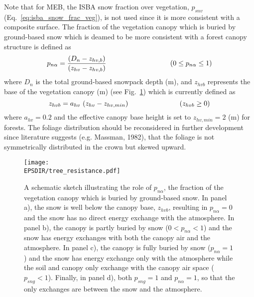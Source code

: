 Note that for MEB, the ISBA snow fraction over vegetation, 
$p_{snv}$ (Eq.~\ref{eq:isba_snow_frac_veg}), 
is not used since it is
more consistent with a composite surface.
The fraction of the vegetation canopy which is buried by ground-based snow
which is deamed to be more consistent with a forest canopy structure
is defined as 
%
\begin{equation}
\label{eq:meb_LAIcansnow}
p_{n\alpha} = 
\frac
{\left(D_n - z_{hv,b}\right)}
{\left(z_{hv} - z_{hv,b}\right)}
\hskip1.25in
\left( 0 \leq  p_{n\alpha} \leq 1\right)
\end{equation}
%
where $D_n$ is the total ground-based snowpack depth (m), 
and $z_{hvb}$
represents the base of the vegetation canopy (m) 
(see Fig.~\ref{fig:forest_snow_MEB}) which is currently defined as
%
\begin{equation}
\label{eq:meb_pn_alphan}
z_{hvb} = a_{hv}\,\left(z_{hv} - z_{hv,min}\right)
\hskip1.in
\left(z_{hvb} \geq 0\right)
%
\end{equation}
%
where $a_{hv}=0.2$ and the effective canopy base height is
set to $z_{hv,min}=2$ (m) for forests. The foliage distribution
should be reconsidered in further development since literature
suggests
(e.g. Massman, 1982)\nocite{Massman1982}, 
that the foliage is not
symmetrically distributed in the crown but skewed upward.



\begin{figure}[!b]
\centerline{ 
\texttt{[image: \\EPSDIR/tree\_resistance.pdf]}}
\caption{
A schematic sketch illustrating the role of $p_{n\alpha}$, the fraction of the vegetation
canopy which is buried by ground-based snow. In panel a), the snow is well
below the canopy base, $z_{hvb}$, 
resulting in $p_{n\alpha}=0$ and the snow has no direct energy exchange with the atmosphere.
In panel b), the canopy is partly buried by snow ($0<p_{n\alpha}<1$) and the snow has energy exchanges
with both the canopy air and the atmosphere.
In panel c), the canopy is fully buried by snow ($p_{n\alpha}=1$) and the snow has energy exchange
only with the atmosphere while the soil and canopy only exchange with
the canopy air space ($p_{sng}<1$). Finally, in panel d), both
$p_{sng}=1$ and $p_{n\alpha}=1$, so
that the only exchanges are between the snow and the atmosphere.
}
\label{fig:forest_snow_MEB}
\end{figure}


